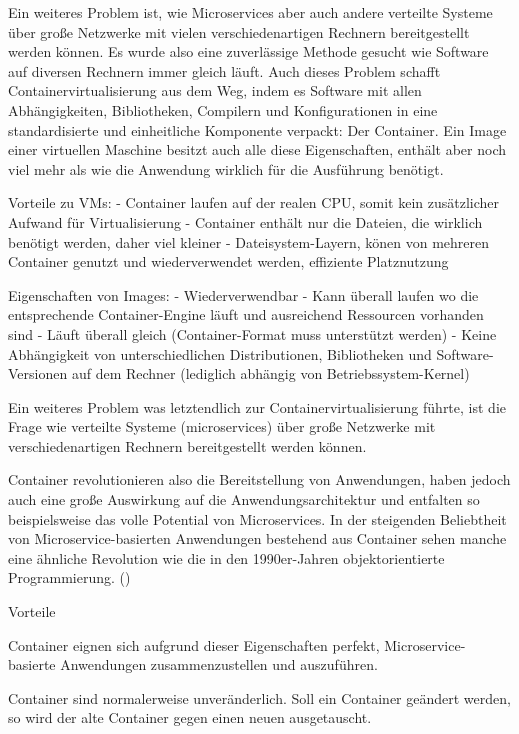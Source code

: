 Ein weiteres Problem ist, wie Microservices aber auch andere verteilte Systeme über große Netzwerke mit vielen verschiedenartigen Rechnern bereitgestellt werden können. Es wurde also eine zuverlässige Methode gesucht wie Software auf diversen Rechnern immer gleich läuft. Auch dieses Problem schafft Containervirtualisierung aus dem Weg, indem es Software mit allen Abhängigkeiten, Bibliotheken, Compilern und Konfigurationen in eine standardisierte und einheitliche Komponente verpackt: Der Container. 
Ein Image einer virtuellen Maschine besitzt auch alle diese Eigenschaften, enthält aber noch viel mehr als wie die Anwendung wirklich für die Ausführung benötigt.

Vorteile zu VMs:
- Container laufen auf der realen CPU, somit kein zusätzlicher Aufwand für Virtualisierung
- Container enthält nur die Dateien, die wirklich benötigt werden, daher viel kleiner
- Dateisystem-Layern, könen von mehreren Container genutzt und wiederverwendet werden, effiziente Platznutzung

Eigenschaften von Images:
- Wiederverwendbar
- Kann überall laufen wo die entsprechende Container-Engine läuft und ausreichend Ressourcen vorhanden sind
- Läuft überall gleich (Container-Format muss unterstützt werden)
- Keine Abhängigkeit von unterschiedlichen Distributionen, Bibliotheken und Software-Versionen auf dem Rechner (lediglich abhängig von Betriebssystem-Kernel)

Ein weiteres Problem was letztendlich zur Containervirtualisierung führte, ist die Frage wie verteilte Systeme (microservices) über große Netzwerke mit verschiedenartigen Rechnern bereitgestellt werden können. 

Container revolutionieren also die Bereitstellung von Anwendungen, haben jedoch auch eine große Auswirkung auf die Anwendungsarchitektur und entfalten so beispielsweise das volle Potential von Microservices.
In der steigenden Beliebtheit von Microservice-basierten Anwendungen bestehend aus Container sehen manche eine ähnliche Revolution wie die in den 1990er-Jahren objektorientierte Programmierung. (\cite[S. 1]{burnsDesign2016})

{Vorteile}

Container eignen sich aufgrund dieser Eigenschaften perfekt, Microservice-basierte Anwendungen zusammenzustellen und auszuführen. 

Container sind normalerweise unveränderlich. Soll ein Container geändert werden, so wird der alte Container gegen einen neuen ausgetauscht.


